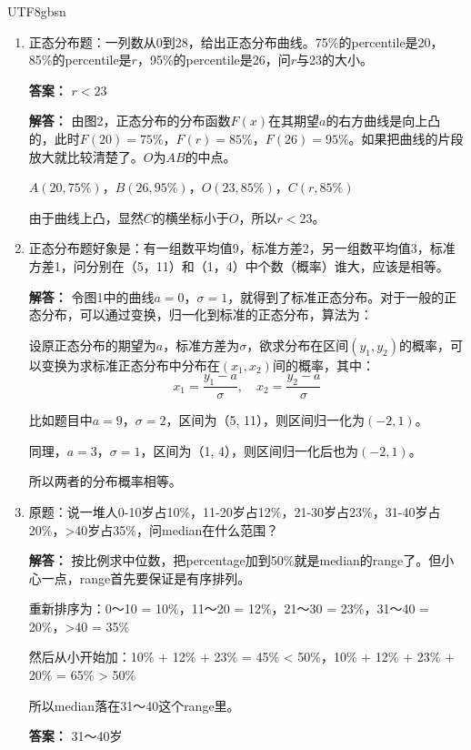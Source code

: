 \documentclass[12pt]{article}
\begin{document}
\begin{CJK*}{UTF8}{gbsn}
\begin{enumerate}
    \textbf{答案：} $n$是整数，前$\geq$后（$n=0$，等；$n=-1,-2,\ldots$大于）。
    
    \item 正态分布题：一列数从0到28，给出正态分布曲线。75\%的percentile是20，85\%的percentile是$r$，95\%的percentile是26，问$r$与23的大小。
    
    \textbf{答案：} $r < 23$
    
    \textbf{解答：} 由图2，正态分布的分布函数$F(x)$在其期望$a$的右方曲线是向上凸的，此时$F(20)=75\%$，$F(r)=85\%$，$F(26)=95\%$。如果把曲线的片段放大就比较清楚了。$O$为$AB$的中点。
    
    $A(20, 75\%)$，$B(26, 95\%)$，$O(23, 85\%)$，$C(r, 85\%)$
    
    由于曲线上凸，显然$C$的横坐标小于$O$，所以$r < 23$。
    
    \item 正态分布题好象是：有一组数平均值9，标准方差2，另一组数平均值3，标准方差1，问分别在（5，11）和（1，4）中个数（概率）谁大，应该是相等。
    
    \textbf{解答：} 令图1中的曲线$a=0$，$\sigma=1$，就得到了标准正态分布。对于一般的正态分布，可以通过变换，归一化到标准的正态分布，算法为：
    
    设原正态分布的期望为$a$，标准方差为$\sigma$，欲求分布在区间$(y_1, y_2)$的概率，可以变换为求标准正态分布中分布在$(x_1, x_2)$间的概率，其中：
    $$x_1 = \frac{y_1 - a}{\sigma}, \quad x_2 = \frac{y_2 - a}{\sigma}$$
    
    比如题目中$a=9$，$\sigma=2$，区间为（5, 11），则区间归一化为$(-2, 1)$。
    
    同理，$a=3$，$\sigma=1$，区间为（1, 4），则区间归一化后也为$(-2, 1)$。
    
    所以两者的分布概率相等。
    
    \item 原题：说一堆人0-10岁占10\%，11-20岁占12\%，21-30岁占23\%，31-40岁占20\%，>40岁占35\%，问median在什么范围？
    
    \textbf{解答：} 按比例求中位数，把percentage加到50\%就是median的range了。但小心一点，range首先要保证是有序排列。
    
    重新排序为：0～10 = 10\%，11～20 = 12\%，21～30 = 23\%，31～40 = 20\%，>40 = 35\%
    
    然后从小开始加：10\% + 12\% + 23\% = 45\% < 50\%，10\% + 12\% + 23\% + 20\% = 65\% > 50\%
    
    所以median落在31～40这个range里。
    
    \textbf{答案：} 31～40岁
\end{enumerate}

\end{CJK*}
\end{document}
